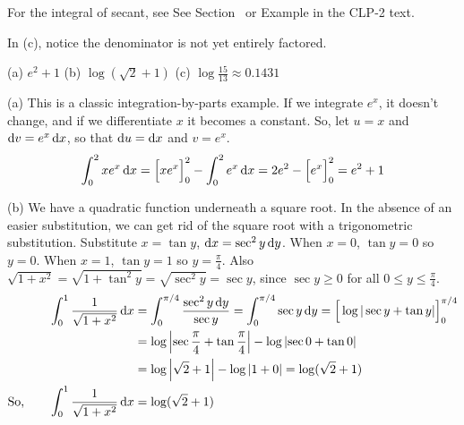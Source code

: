 \begin{hint}
For the integral of secant, see
See Section~ or Example  in the
CLP-2 text.

In (c), notice the denominator is not yet entirely factored.
\end{hint}

\begin{answer} (a)
$e^2+1$
\qquad (b)
$\log(\sqrt{2}+1)$
\qquad (c)
$\log\frac{15}{13}\approx 0.1431$
\end{answer}

\begin{solution} (a) This is a classic integration-by-parts example. If we integrate $e^x$, it doesn't change, and if we differentiate $x$ it becomes a constant. So,
let $u=x$ and $\mathrm{d}v=e^x\,\mathrm{d}x$,
so that $\mathrm{d}u=\mathrm{d}x$ and $v=e^x$.
\begin{align*}
\int_0^2 xe^x\,\mathrm{d}x=\Big[xe^x\Big]_0^2-\int_0^2 e^x\,\mathrm{d}x
=2e^2-\Big[e^x\Big]_0^2
=e^2+1
\end{align*}


\noindent (b)  We have a quadratic function underneath a square root. In the absence of an easier substitution, we can get rid of the square root with a trigonometric substitution.
 Substitute $x=\tan y$, $\mathrm{d}x=\sec^2 y\,\mathrm{d}y$. When $x=0$, $\tan y=0$
so $y=0$. When $x=1$, $\tan y=1$ so $y=\frac{\pi}{4}$. Also $\sqrt{1+x^2}
=\sqrt{1+\tan^2y}=\sqrt{\sec^2 y}=\sec y$, since $\sec y\ge 0$ for all
$0\le y\le\frac{\pi}{4}$.
\begin{align*}
\int_0^1\frac{1}{\sqrt{1+x^2}}\,\mathrm{d}x
&=\int_0^{\pi/4} \frac{\sec^2y\,\mathrm{d}y}{\sec y}
=\int_0^{\pi/4} \sec y\,\mathrm{d}y
=\Big[\log|\sec y+\tan y|\Big]_0^{\pi/4}\\
&=\log\left| \sec \frac{\pi}{4}  + \tan\frac{\pi}{4}\right|-\log\left| \sec 0 + \tan 0\right|\\
&=\log\left| \sqrt{2}  + 1\right|-\log\left| 1+  0\right|=\log(\sqrt{2}+1)\\
\text{So,}\qquad\int_0^1\frac{1}{\sqrt{1+x^2}}\,\mathrm{d}x&=\log(\sqrt{2}+1)
\end{align*}



\end{solution}
